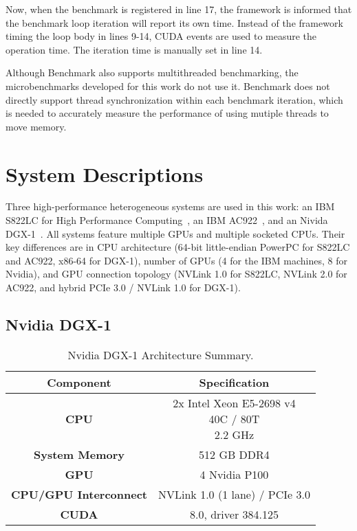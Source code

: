 Now, when the benchmark is registered in line 17, the framework is informed that the benchmark loop iteration will report its own time.
Instead of the framework timing the loop body in lines 9-14, CUDA events are used to measure the operation time.
The iteration time is manually set in line 14.

Although Benchmark also supports multithreaded benchmarking, the microbenchmarks developed for this work do not use it.
Benchmark does not directly support thread synchronization within each benchmark iteration, which is needed to accurately measure the performance of using mutiple threads to move memory.

\section{System Descriptions}
\label{sec:system-descriptions}

Three high-performance heterogeneous systems are used in this work: an IBM S822LC for High Performance Computing~\cite{caldeira2016s822lc}, an IBM AC922~\cite{caldeira2018ac922}, and an Nivida DGX-1~\cite{nvidia2017dgx1}.
All systems feature multiple GPUs and multiple socketed CPUs.
Their key differences are in CPU architecture (64-bit little-endian PowerPC for S822LC and AC922, x86-64 for DGX-1), number of GPUs (4 for the IBM machines, 8 for Nvidia), and GPU connection topology (NVLink 1.0 for S822LC, NVLink 2.0 for AC922, and hybrid PCIe 3.0 / NVLink 1.0 for DGX-1).

\subsection{Nvidia DGX-1}
\label{sec:dgx1}

\begin{table}[ht]
    \centering
    \caption[Nvidia DGX-1 Architecture Summary]{
		Nvidia DGX-1 Architecture Summary.
	}
    \label{tab:dgx1}
    \begin{tabular}{cc}
    \hline
    \textbf{Component}            & \textbf{Specification}                                      \\ \hline
    \textbf{CPU}                  & \makecell{2x Intel Xeon E5-2698 v4 \\ 40C / 80T \\ 2.2 GHz} \\ \hline
    \textbf{System Memory}        & 512 GB DDR4                                                 \\ \hline
	\textbf{GPU}                  & 4 Nvidia P100                                               \\ \hline
	\textbf{CPU/GPU Interconnect} & NVLink 1.0 (1 lane) / PCIe 3.0                              \\ \hline
	\textbf{CUDA}                 & 8.0, driver 384.125                                         \\ \hline
    \end{tabular}
\end{table}

